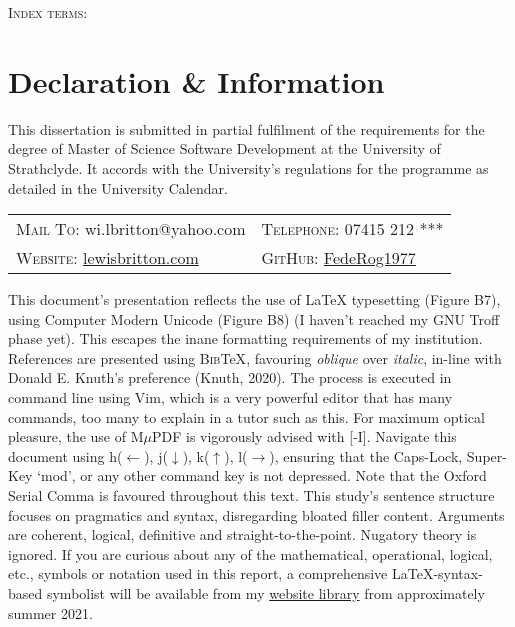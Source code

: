 \documentclass[11pt, english]{article}
\begin{document}
\newpage


	\begin{abstract}
	\end{abstract}

	\textsc{Index terms:}

\newpage

	\section*{Declaration \& Information}

	This dissertation is submitted in partial fulfilment of the requirements for the degree of Master of Science Software Development at the University of Strathclyde. It accords with the University’s regulations for the programme as detailed in the University Calendar.

	\begin{center}
		\small
	\begin{tabular}{p{5.45cm}|p{5.45cm}}
		\textsc{Mail To:} wi.lbritton@yahoo.com & \textsc{Telephone:} 07415 212 ***\\
		\textsc{Website:} \href{http://lewisbritton.com}{lewisbritton.com} & \textsc{GitHub:} \href{https://github.com/FedeRog1977}{FedeRog1977}\\
	\end{tabular}
	\end{center}

	This document’s presentation reflects the use of {\LaTeX} typesetting (Figure B7), using Computer Modern Unicode (Figure B8) (I haven't reached my GNU Troff phase yet). This escapes the inane formatting requirements of my institution. References are presented using \textsc{Bib}{\TeX}, favouring \textsl{oblique} over \textit{italic}, in-line with Donald E. Knuth’s preference (Knuth, 2020). The process is executed in command line using Vim, which is a very powerful editor that has many commands, too many to explain in a tutor such as this. For maximum optical pleasure, the use of M$\mu$PDF is vigorously advised with [-I]. Navigate this document using h($\leftarrow$), j($\downarrow$), k($\uparrow$), l($\rightarrow$), ensuring that the Caps-Lock, Super-Key `mod', or any other command key is not depressed. Note that the Oxford Serial Comma is favoured throughout this text. This study's sentence structure focuses on pragmatics and syntax, disregarding bloated filler content. Arguments are coherent, logical, definitive and straight-to-the-point. Nugatory theory is ignored. If you are curious about any of the mathematical, operational, logical, etc., symbols or notation used in this report, a comprehensive {\LaTeX}-syntax-based symbolist will be available from my \href{http://lewisbritton.com/Library.html}{website library} from approximately summer 2021.\\
 
\end{document}
